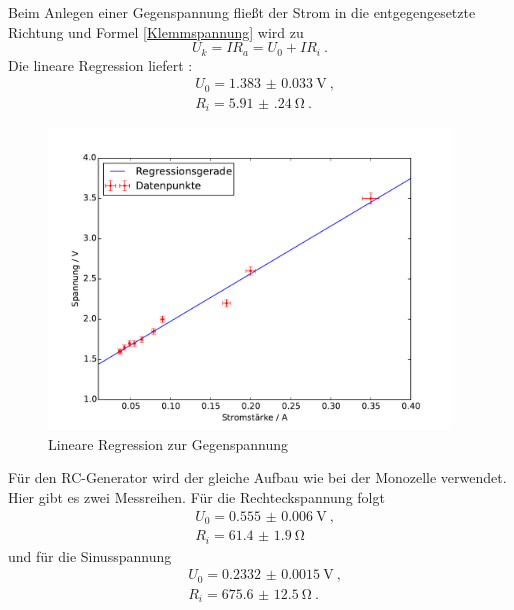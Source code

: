 Beim Anlegen einer Gegenspannung fließt der Strom in die entgegengesetzte Richtung und Formel \eqref{Klemmspannung} wird zu
\begin{equation}
U_k = IR_a = U_0+IR_i  \  .
\end{equation}
Die lineare Regression liefert :
\begin{align}
&U_0 = \SI{1.383(33)}{\volt} \ , \\
&R_i = \SI{5.91(24)}{\ohm}  \ .
\end{align}
\begin{figure}[h!]
	\centering
	\includegraphics[width=0.95\textwidth]{Spannung_Messung_c.pdf}
	\caption{Lineare Regression zur Gegenspannung}
	\label{fig:L_kleiner_Druck}
\end{figure}


Für den RC-Generator wird der gleiche Aufbau wie bei der Monozelle verwendet. Hier gibt es zwei Messreihen. Für die Rechteckspannung folgt
\begin{align}
&U_0 = \SI{0.555(6)}{\volt} \ , \\
&R_i = \SI{61.4(19)}{\ohm} 
\end{align}
und für die Sinusspannung
\begin{align}
&U_0 = \SI{0.2332(15)}{\volt} \ , \\
&R_i = \SI{675.6(125)}{\ohm} \ .
\end{align}







